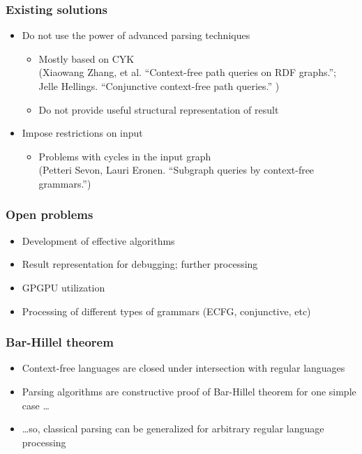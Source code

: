 \documentclass{beamer}
\begin{document}
\begin{frame}
  \transwipe[direction=90]
  \frametitle{Existing solutions}
  \begin{itemize}
    \item Do not use the power of advanced parsing techniques
    \begin{itemize}
       \item Mostly based on CYK \\ (Xiaowang Zhang, et al. ``Context-free path queries on RDF graphs.''; \\ Jelle Hellings. ``Conjunctive context-free path queries.'' )
       \item Do not provide useful structural representation of result
     \end{itemize}
    \item Impose restrictions on input
    \begin{itemize}
       \item Problems with cycles in the input graph \\ (Petteri Sevon, Lauri Eronen. ``Subgraph queries by context-free grammars.'')
     \end{itemize}
  \end{itemize}
\end{frame}

\begin{frame}
  \transwipe[direction=90]
  \frametitle{Open problems}
  \begin{itemize}
    \item Development of effective algorithms
    \item Result representation for debugging; further processing 
    \item GPGPU utilization
    \item Processing of different types of grammars (ECFG, conjunctive, etc)
  \end{itemize}
\end{frame}

\begin{frame}
  \transwipe[direction=90]
  \frametitle{Bar-Hillel theorem}
  \begin{itemize}
    \item Context-free languages are closed under intersection with regular languages
    \item Parsing algorithms are constructive proof of Bar-Hillel theorem for one simple case \dots
    \item \dots so, classical parsing can be generalized for arbitrary regular language processing
  \end{itemize}
\end{frame}
\end{document}
